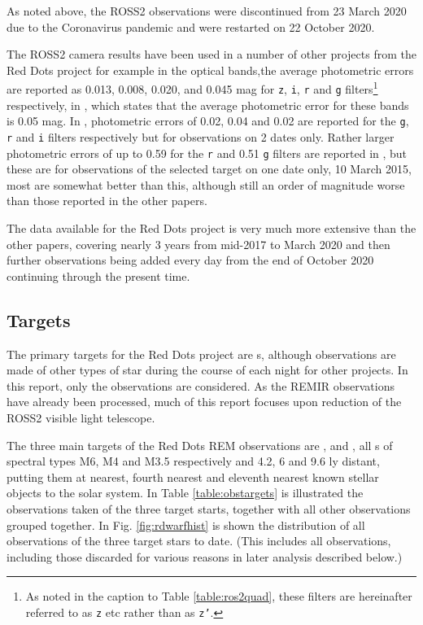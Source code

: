 As noted above, the ROSS2 observations were discontinued from 23 March 2020 due
to the Coronavirus pandemic and were restarted on 22 October 2020.

The ROSS2 camera results have been used in a number of other projects from the
Red Dots project for example in \citet{frasca20} the optical bands,the average
photometric errors are reported as 0.013, 0.008, 0.020, and 0.045 mag for
\texttt{z}, \texttt{i}, \texttt{r} and \texttt{g} filters\footnote{As noted in
the caption to Table \ref{table:ros2quad}, these filters are hereinafter
referred to as \texttt{z} etc rather than as \texttt{z'}.} respectively, in
\citet{giannini20}, which states that the average photometric error for these
bands is 0.05 mag. In \citet{riverasandoval18}, photometric errors of 0.02, 0.04
and 0.02 are reported for the \texttt{g}, \texttt{r} and \texttt{i} filters
respectively but for observations on 2 dates only. Rather larger photometric
errors of up to 0.59 for the \texttt{r} and 0.51 \texttt{g} filters are reported
in \citet{pastorello15}, but these are for observations of the selected target
on one date only, 10 March 2015, most are somewhat better than this, although
still an order of magnitude worse than those reported in the other papers.

The data available for the Red Dots project is very much more extensive than the
other papers, covering nearly 3 years from mid-2017 to March 2020 and then
further observations being added every day from the end of October 2020
continuing through the present time.

\subsection{Targets}

The primary targets for the Red Dots project are \rdwarf s, although
observations are made of other types of star during the course of each night
for other projects. In this report, only the {\rdwarf} observations are
considered. As the REMIR observations have already been processed, much of this report
focuses upon reduction of the ROSS2 visible light telescope.

The three main targets of the Red Dots REM observations are \prox, {\bstar} and
\ross, all \rdwarf s of spectral types M6, M4 and M3.5 respectively and 4.2, 6
and 9.6 ly distant, putting them at nearest, fourth nearest and eleventh nearest known
stellar objects to the solar system. In Table \ref{table:obstargets} is
illustrated the observations taken of the three target {\rdwarf} starts,
together with all other observations grouped together. In Fig.
\ref{fig:rdwarfhist} is shown the distribution of all observations of the three
target stars to date. (This includes all observations, including those
discarded for various reasons in later analysis described below.)

